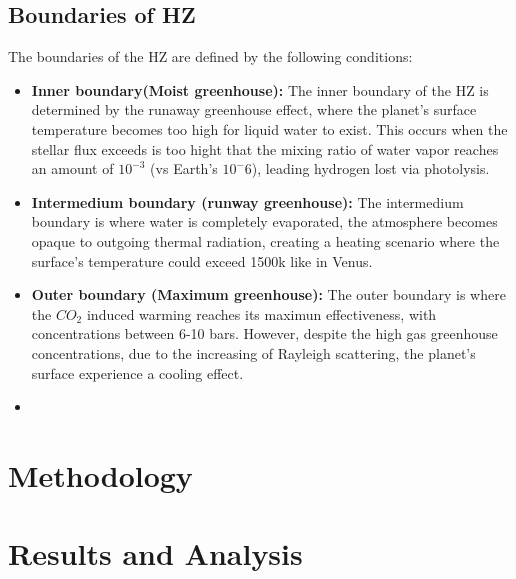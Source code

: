 \documentclass{article}
\begin{document}
\begin{multicols}{2}
    \subsection{\textbf{Boundaries of HZ}}
    The boundaries of the HZ  are defined by the following conditions: 
    \begin{itemize}
        \item \textbf{Inner boundary(Moist greenhouse):} The inner boundary of the HZ is determined by the runaway greenhouse effect, where the planet's surface temperature becomes too high for liquid water to exist. This occurs when the stellar flux exceeds is too hight that the mixing ratio of water vapor reaches an amount of $10^{-3}$ (vs Earth's $10^-6$), leading hydrogen lost via photolysis. 
        \item \textbf{Intermedium boundary (runway greenhouse):} The intermedium boundary is where water is completely evaporated, the atmosphere becomes opaque to outgoing thermal radiation, creating a heating scenario where the surface's temperature could exceed 1500k like in Venus.\\
        \item \textbf{Outer boundary (Maximum greenhouse):} The outer boundary is where the $CO_{2}$ induced warming reaches its maximun effectiveness, with concentrations between 6-10 bars. However, despite the high  gas greenhouse concentrations, due to the increasing of Rayleigh scattering, the planet's surface experience a cooling effect.\\
        \item 
    \end{itemize}
\section{Methodology} 
 

\section{Results and Analysis} 


\end{multicols}
\end{document}
